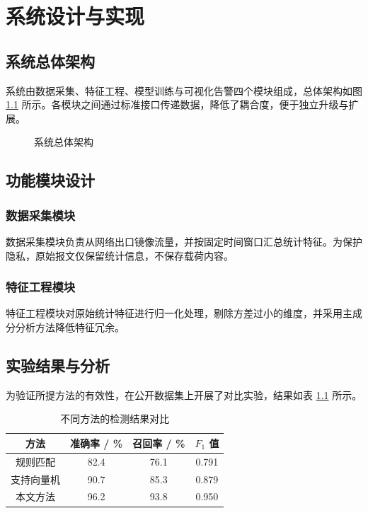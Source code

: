 \chapter{系统设计与实现}

\section{系统总体架构}

系统由数据采集、特征工程、模型训练与可视化告警四个模块组成，总体架构如图 \ref{fig:ch3-arch} 所示。各模块之间通过标准接口传递数据，降低了耦合度，便于独立升级与扩展。

\begin{figure}[htbp]
  \centering
  \caption{系统总体架构}
  \label{fig:ch3-arch}
\end{figure}

\section{功能模块设计}

\subsection{数据采集模块}

数据采集模块负责从网络出口镜像流量，并按固定时间窗口汇总统计特征。为保护隐私，原始报文仅保留统计信息，不保存载荷内容。

\subsection{特征工程模块}

特征工程模块对原始统计特征进行归一化处理，剔除方差过小的维度，并采用主成分分析方法降低特征冗余。

\section{实验结果与分析}

为验证所提方法的有效性，在公开数据集上开展了对比实验，结果如表 \ref{tab:ch3-result} 所示。

\begin{table}[htbp]
  \centering
  \caption{不同方法的检测结果对比}
  \label{tab:ch3-result}
  \begin{tabular}{@{}cccc@{}}
    \toprule
    方法 & 准确率 / \% & 召回率 / \% & $F_1$ 值 \\
    \midrule
    规则匹配 & 82.4 & 76.1 & 0.791 \\
    支持向量机 & 90.7 & 85.3 & 0.879 \\
    本文方法 & 96.2 & 93.8 & 0.950 \\
    \bottomrule
  \end{tabular}
\end{table}

